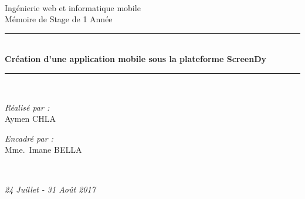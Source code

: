 \documentclass[12pt,a4paper]{report}
\makeatletter
\newcommand\mainmatter{%
	\cleardoublepage
	\pagenumbering{arabic}}
\makeatother
\begin{document}
\begin{titlepage}
\begin{center}
\begin{minipage}{0.4\textwidth}
		\end{minipage}\\[3cm]



		{\normalsize Ingénierie web et informatique mobile }\\[0.5cm]

		{\normalsize M\'emoire de Stage de  1 Ann\'ee}\\[0.5cm]

		\rule{\linewidth}{0.5mm} \\[0.4cm]
		{ \large \bfseries Création d'une application mobile sous la plateforme ScreenDy \\[0.4cm] }
		\rule{\linewidth}{0.5mm} \\[3cm]

		\noindent
		\begin{minipage}{0.4\textwidth}
		  \begin{flushleft} \small
		    \emph{Réalisé par :}\\
		     Aymen \textsc{CHLA}\\
		  \end{flushleft}
		\end{minipage}%
		\begin{minipage}{0.4\textwidth}
		  \begin{flushright} \small
		    \emph{Encadré par :} \\
		    Mme.~Imane \textsc{BELLA}\\  
		  \end{flushright}
		\end{minipage}\\[4cm]

		\vfill

		{\large \slshape 24 Juillet - 31 Août 2017}

		\end{center}
	\end{titlepage}
	
	\restoregeometry
	\normalsize
	\clearpage
	\mainmatter


	\begingroup
	  \pagestyle{empty}
	  \null
	  \newpage
	\endgroup
	
	
	
\end{document}
